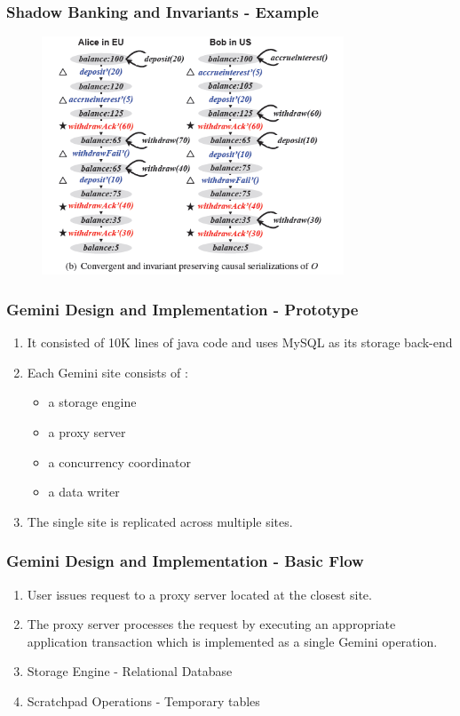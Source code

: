 \documentclass{beamer}
\begin{document}

\begin{frame}
\frametitle{Shadow Banking and Invariants - Example}
\begin{figure}[t]
\includegraphics[width=9cm]{pic9.jpg}
\centering
\end{figure}

\end{frame}





\begin{frame}
\frametitle{Gemini Design and Implementation - Prototype}
\begin{enumerate}
\item It consisted of 10K lines of java code and uses MySQL as its storage back-end
\item Each Gemini site consists of :
\begin{itemize}
\item a storage engine
\item a proxy server
\item a concurrency coordinator
\item a data writer
\end{itemize}
\item The single site is replicated across multiple sites.
\end{enumerate}
\end{frame}


\begin{frame}
\frametitle{Gemini Design and Implementation - Basic Flow}
\begin{enumerate}
\item User issues request to a proxy server located at the closest site.
\item The proxy server processes the request by executing an appropriate application transaction which is implemented as a single Gemini operation. 
\item Storage Engine - Relational Database
\item Scratchpad Operations - Temporary tables
\end{enumerate}
\end{frame}
\end{document}
